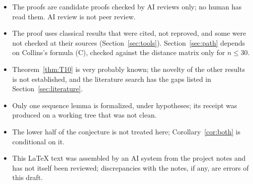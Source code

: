 \documentclass[11pt]{amsart}
\theoremstyle{definition}
\theoremstyle{remark}
\begin{document}
\begin{itemize}
\item The proofs are candidate proofs checked by AI reviews only; no human
has read them. AI review is not peer review.
\item The proof uses classical results that were cited, not reproved, and
some were not checked at their sources (Section~\ref{sec:tools}).
Section~\ref{sec:path} depends on Collins's formula (C), checked against the
distance matrix only for $n\le30$.
\item Theorem~\ref{thm:T10} is very probably known; the novelty of the other
results is not established, and the literature search has the gaps listed
in Section~\ref{sec:literature}.
\item Only one sequence lemma is formalized, under hypotheses; its receipt
was produced on a working tree that was not clean.
\item The lower half of the conjecture is not treated here;
Corollary~\ref{cor:both} is conditional on it.
\item This \LaTeX{} text was assembled by an AI system from the project notes
and has not itself been reviewed; discrepancies with the notes, if any, are
errors of this draft.
\end{itemize}
\end{document}
